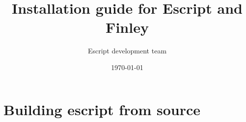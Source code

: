 \documentclass{manual}
\title{Installation guide for Escript and Finley}
\author{Escript development team}
\date{\today}
\begin{document}
\maketitle
\tableofcontents



% 
\chapter{Building escript from source}
\label{chap:essrc}
 
\end{document}
